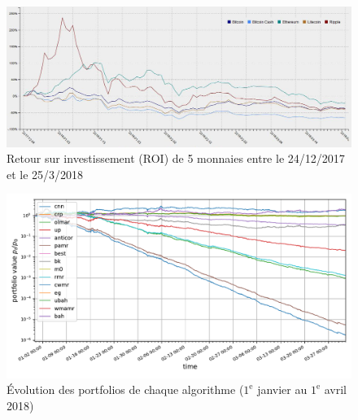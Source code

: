 \documentclass[a4paper, 10pt]{article}
\begin{document}
\begin{figure}[ht!]
\begin{center}
\includegraphics[width=1.0\textwidth]{images/ROI_low.JPG}
\caption{Retour sur investissement (ROI) de 5 monnaies entre le 24/12/2017 et le 25/3/2018}
\label{fig:roi_low}
\end{center}
\end{figure}

\begin{figure}[ht!]
\begin{center}
\includegraphics[width=1.0\textwidth]{images/plot_low.pdf}
\caption{Évolution des portfolios de chaque algorithme ($1^{\text{e}}$ janvier au $1^{\text{e}}$ avril 2018)}
\label{fig:plot_low}
\end{center}
\end{figure}
\end{document}
